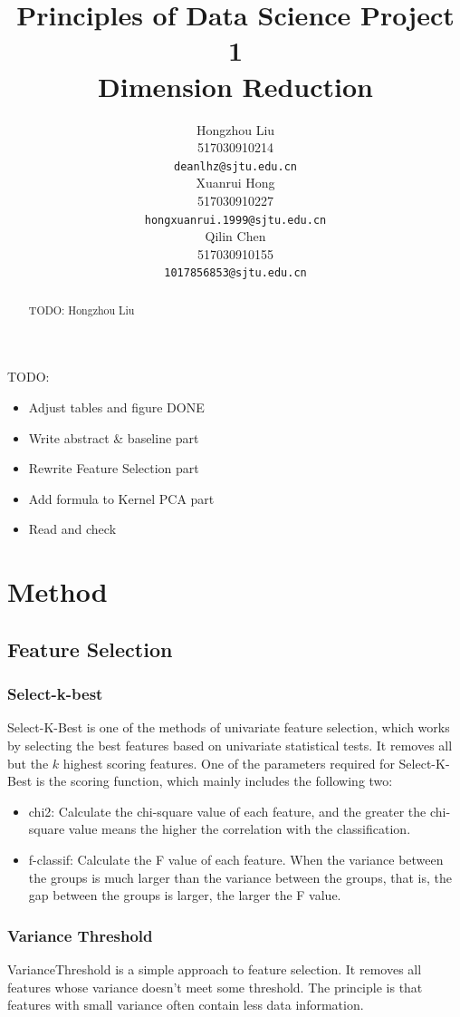 \documentclass{article}
\title{Principles of Data Science Project 1\\
        Dimension Reduction}
\author{
  Hongzhou Liu \\
  517030910214 \\
  \texttt{deanlhz@sjtu.edu.cn} \\
  \And
  Xuanrui Hong \\
  517030910227 \\
  \texttt{hongxuanrui.1999@sjtu.edu.cn} \\
  \And
  Qilin Chen \\
  517030910155 \\
  \texttt{1017856853@sjtu.edu.cn} \\
}
\begin{document}


\maketitle

TODO:
\begin{itemize}
	\item Adjust tables and figure DONE
	\item Write abstract \& baseline part
	\item Rewrite Feature Selection part
	\item Add formula to Kernel PCA part
	\item Read and check
\end{itemize}

\begin{abstract}
  TODO: Hongzhou Liu\\
\end{abstract}

\section{Method}
\subsection{Feature Selection}
\subsubsection{Select-k-best}
\indent Select-K-Best is one of the methods of univariate feature selection, which works by selecting the best features based on univariate statistical tests. It removes all but the $k$ highest scoring features. One of the parameters required for Select-K-Best is the scoring function, which mainly includes the following two:
\begin{itemize}
	\item chi2: Calculate the chi-square value of each feature, and the greater the chi-square value means the higher the correlation with the classification.
	
	\item f-classif: Calculate the F value of each feature. When the variance between the groups is much larger than the variance between the groups, that is, the gap between the groups is larger, the larger the F value.	
\end{itemize}
\subsubsection{Variance Threshold}
\indent VarianceThreshold is a simple approach to feature selection. It removes all features whose variance doesn’t meet some threshold. The principle is that features with small variance often contain less data information.
\end{document}
